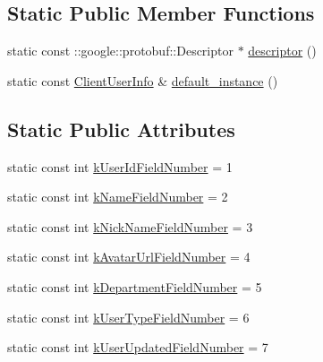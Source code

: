 \subsection*{Static Public Member Functions}
\begin{DoxyCompactItemize}
\item 
static const \+::google\+::protobuf\+::\+Descriptor $\ast$ \hyperlink{class_i_m_1_1_base_define_1_1_client_user_info_aef3c099890ecfceadd3e22f531c2b176}{descriptor} ()
\item 
static const \hyperlink{class_i_m_1_1_base_define_1_1_client_user_info}{Client\+User\+Info} \& \hyperlink{class_i_m_1_1_base_define_1_1_client_user_info_af702757cdba850b362ea57ab315989f3}{default\+\_\+instance} ()
\end{DoxyCompactItemize}
\subsection*{Static Public Attributes}
\begin{DoxyCompactItemize}
\item 
static const int \hyperlink{class_i_m_1_1_base_define_1_1_client_user_info_abbe0b6c4803f5022c03f5d82830fac2f}{k\+User\+Id\+Field\+Number} = 1
\item 
static const int \hyperlink{class_i_m_1_1_base_define_1_1_client_user_info_a0061a6c8303456948fb1ca4c575998e9}{k\+Name\+Field\+Number} = 2
\item 
static const int \hyperlink{class_i_m_1_1_base_define_1_1_client_user_info_a86c1b9330761a61bd8f5dbe87ed10a94}{k\+Nick\+Name\+Field\+Number} = 3
\item 
static const int \hyperlink{class_i_m_1_1_base_define_1_1_client_user_info_a81e97baa4c4fb728ef326cca74aaf626}{k\+Avatar\+Url\+Field\+Number} = 4
\item 
static const int \hyperlink{class_i_m_1_1_base_define_1_1_client_user_info_a544e5dd1d322bd4b0109f3eabd792b04}{k\+Department\+Field\+Number} = 5
\item 
static const int \hyperlink{class_i_m_1_1_base_define_1_1_client_user_info_a4d1b54428193c11f863ad36cca8140c8}{k\+User\+Type\+Field\+Number} = 6
\item 
static const int \hyperlink{class_i_m_1_1_base_define_1_1_client_user_info_a06425b0d90160084e9a294b16c918901}{k\+User\+Updated\+Field\+Number} = 7
\end{DoxyCompactItemize}

